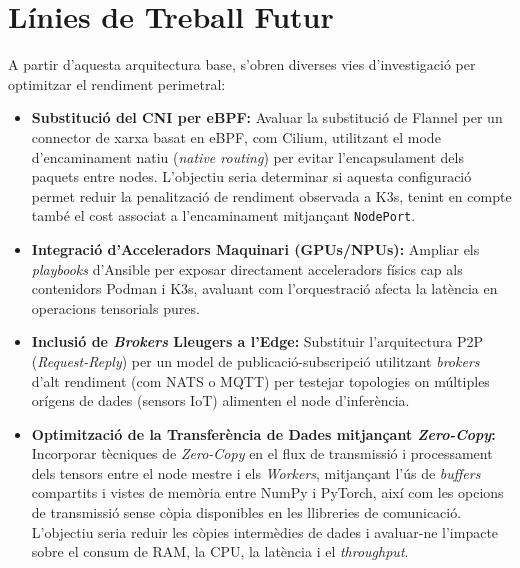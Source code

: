 \section{Línies de Treball Futur}
A partir d'aquesta arquitectura base, s'obren diverses vies d'investigació per optimitzar el rendiment perimetral:
\begin{itemize}
    \item \textbf{Substitució del CNI per eBPF:} Avaluar la substitució de Flannel per un connector de xarxa basat en eBPF, com Cilium, utilitzant el mode d'encaminament natiu (\textit{native routing}) per evitar l'encapsulament dels paquets entre nodes. L'objectiu seria determinar si aquesta configuració permet reduir la penalització de rendiment observada a K3s, tenint en compte també el cost associat a l'encaminament mitjançant \texttt{NodePort}.
    \item \textbf{Integració d'Acceleradors Maquinari (GPUs/NPUs):} Ampliar els \textit{playbooks} d'Ansible per exposar directament acceleradors físics cap als contenidors Podman i K3s, avaluant com l'orquestració afecta la latència en operacions tensorials pures.
    \item \textbf{Inclusió de \textit{Brokers} Lleugers a l'Edge:} Substituir l'arquitectura P2P (\textit{Request-Reply}) per un model de publicació-subscripció utilitzant \textit{brokers} d'alt rendiment (com NATS o MQTT) per testejar topologies on múltiples orígens de dades (sensors IoT) alimenten el node d'inferència.
    \item \textbf{Optimització de la Transferència de Dades mitjançant \textit{Zero-Copy}:} Incorporar tècniques de \textit{Zero-Copy} en el flux de transmissió i processament dels tensors entre el node mestre i els \textit{Workers}, mitjançant l'ús de \textit{buffers} compartits i vistes de memòria entre NumPy i PyTorch, així com les opcions de transmissió sense còpia disponibles en les llibreries de comunicació. L'objectiu seria reduir les còpies intermèdies de dades i avaluar-ne l'impacte sobre el consum de RAM, la CPU, la latència i el \textit{throughput}.
\end{itemize}